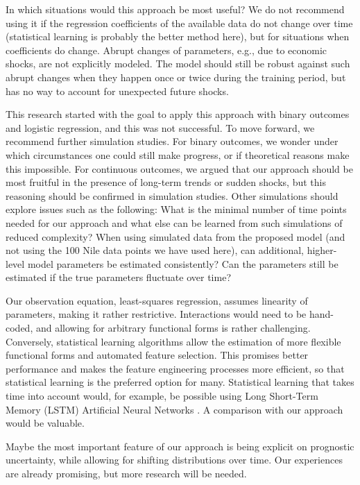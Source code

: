 \documentclass{article}
\begin{document}
In which situations would this approach be most useful? We do not recommend using it if the regression coefficients of the available data do not change over time (statistical learning is probably the better method here), but for situations when coefficients do change. Abrupt changes of parameters, e.g., due to economic shocks, are not explicitly modeled. The model should still be robust against such abrupt changes when they happen once or twice during the training period, but has no way to account for unexpected future shocks.

This research started with the goal to apply this approach with binary outcomes and logistic regression, and this was not successful. To move forward, we recommend further simulation studies. For binary outcomes, we wonder under which circumstances one could still make progress, or if theoretical reasons make this impossible. For continuous outcomes, we argued that our approach should be most fruitful in the presence of long-term trends or sudden shocks, but this reasoning should be confirmed in simulation studies. Other simulations should explore issues such as the following: What is the minimal number of time points needed for our approach and what else can be learned from such simulations of reduced complexity? When using simulated data from the proposed model (and not using the 100 Nile data points we have used here), can additional, higher-level model parameters be estimated consistently? Can the parameters still be estimated if the true parameters fluctuate over time?

Our observation equation, least-squares regression, assumes linearity of parameters, making it rather restrictive. Interactions would need to be hand-coded, and allowing for arbitrary functional forms is rather challenging. Conversely, statistical learning algorithms allow the estimation of more flexible functional forms and automated feature selection. This promises better performance and makes the feature engineering processes more efficient, so that statistical learning is the preferred option for many. Statistical learning that takes time into account would, for example, be possible using Long Short-Term Memory (LSTM) Artificial Neural Networks \citep{hochreiter_long_1997}. A comparison with our approach would be valuable.

Maybe the most important feature of our approach is being explicit on prognostic uncertainty, while allowing for shifting distributions over time. Our experiences are already promising, but more research will be needed.
\end{document}
